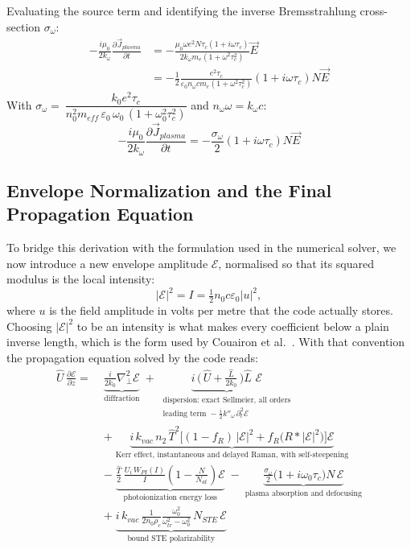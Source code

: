 Evaluating the source term and identifying the inverse Bremsstrahlung cross-section $\sigma_{\omega}$:
\begin{align}
- \frac{i \mu_0}{2 k_{\omega}} \frac{\partial \vec{J}_{plasma}}{\partial t} &= - \frac{\mu_0 \omega e^2 N \tau_c (1 + i \omega \tau_c)}{2 k_{\omega} m_e (1 + \omega^2 \tau_c^2)} \vec{E} \nonumber \\
&= - \frac{1}{2} \frac{e^2 \tau_c}{\varepsilon_0 n_{\omega} c m_e (1 + \omega^2 \tau_c^2)} (1 + i \omega \tau_c) N \vec{E}
\end{align}
With $\sigma_\omega = \ \dfrac{k_0 e^2 \tau_c}{n_0^2 m_{eff}\,\varepsilon_0\,\omega_0\,(1 + \omega_0^2\tau_c^2)}$ and $n_{\omega}\omega = k_{\omega}c$:
\begin{equation}
- \frac{i \mu_0}{2 k_{\omega}} \frac{\partial \vec{J}_{plasma}}{\partial t} = - \frac{\sigma_{\omega}}{2} (1 + i \omega \tau_c) N \vec{E}
\end{equation}

\subsection*{Envelope Normalization and the Final Propagation Equation}
To bridge this derivation with the formulation used in the numerical solver, we now introduce a new envelope amplitude $\mathcal{E}$, normalised so that its squared modulus is the local intensity:
\begin{equation}
\label{eq:envelope_norm}
|\mathcal{E}|^2 = I = \tfrac{1}{2}n_0c\varepsilon_0|u|^2 ,
\end{equation}
where $u$ is the field amplitude in volts per metre that the code actually stores. Choosing $|\mathcal{E}|^2$ to be an intensity is what makes every coefficient below a plain inverse length, which is the form used by Couairon et al.~\cite{PhysRevB.71.125435}. With that convention the propagation equation solved by the code reads:
\begin{align}
\label{eq:master_propagation}
\hat{U}\,\frac{\partial \mathcal{E}}{\partial z} =\;
&\underbrace{\frac{i}{2k_0}\nabla_\perp^2 \mathcal{E}}_{\text{diffraction}}
\;+\;
\underbrace{i\,\Big(\,\hat{U}+\frac{\hat{L}}{2k_0}\,\Big)\hat{L}\,\,\mathcal{E}}_{\substack{\text{dispersion: exact Sellmeier, all orders}\\
\text{leading term } -\tfrac{i}{2}k''_\omega\,\partial_t^2 \mathcal{E}}} \nonumber\\[4pt]
&+\;\underbrace{i\,k_{vac}\,n_2\,\hat{T}^{2}\Big[(1-f_R)\,|\mathcal{E}|^2 + f_R\big(R * |\mathcal{E}|^2\big)\Big]\mathcal{E}}_{\text{Kerr effect, instantaneous and delayed Raman, with self-steepening}} \nonumber\\[4pt]
&-\;\underbrace{\frac{\hat{T}}{2}\,\frac{U_i\,W_{PI}(I)}{I}\left(1-\frac{N}{N_{at}}\right)\mathcal{E}}_{\text{photoionization energy loss}}
\;-\;\underbrace{\frac{\sigma_\omega}{2}\big(1+i\omega_0\tau_c\big)N\,\mathcal{E}}_{\text{plasma absorption and defocusing}} \nonumber\\[4pt]
&+\;\underbrace{i\,k_{vac}\,\frac{1}{2n_0\rho_c}\frac{\omega_0^2}{\omega_{tr}^2-\omega_0^2}\,N_{STE}\,\mathcal{E}}_{\text{bound STE polarizability}}
\end{align}

